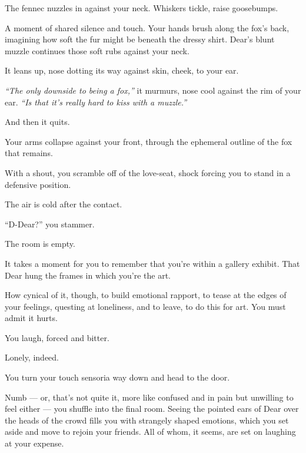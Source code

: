 The fennec nuzzles in against your neck. Whiskers tickle, raise goosebumps.

A moment of shared silence and touch. Your hands brush along the fox's back, imagining how soft the fur might be beneath the dressy shirt. Dear's blunt muzzle continues those soft rubs against your neck.

It leans up, nose dotting its way against skin, cheek, to your ear.

\emph{``The only downside to being a fox,''} it murmurs, nose cool against the rim of your ear. \emph{``Is that it's really hard to kiss with a muzzle.''}

\vfill

\begin{flushright}
\footnotesize
And then it quits.\hspace{2cm}\null
\end{flushright}
\vspace{1cm}

\newpage

\null
\vfill

Your arms collapse against your front, through the ephemeral outline of the fox that remains.

With a shout, you scramble off of the love-seat, shock forcing you to stand in a defensive position.

The air is cold after the contact.

``D-Dear?'' you stammer.

The room is empty.
\vfill
\newpage
\null
\vfill

It takes a moment for you to remember that you're within a gallery exhibit. That Dear hung the frames in which you're the art.

How cynical of it, though, to build emotional rapport, to tease at the edges of your feelings, questing at loneliness, and to leave, to do this for art. You must admit it hurts.

You laugh, forced and bitter.

Lonely, indeed.

You turn your touch sensoria way down and head to the door.

\vfill

\newpage
\null
\newpage

Numb --- or, that's not quite it, more like confused and in pain but unwilling to feel either --- you shuffle into the final room. Seeing the pointed ears of Dear over the heads of the crowd fills you with strangely shaped emotions, which you set aside and move to rejoin your friends. All of whom, it seems, are set on laughing at your expense.

